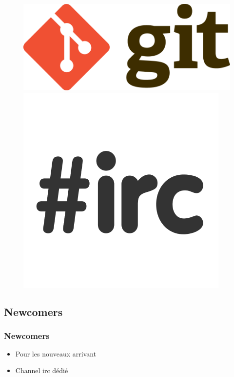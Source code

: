 \documentclass{beamer}
\begin{document}
\begin{frame}
\begin{figure}
    \includegraphics[scale=0.03]{images/git-logo.png} \hspace{1cm}
    \includegraphics[scale=0.07]{images/irc-logo.png}
  \end{figure}
  
\end{frame}

\subsection{Newcomers}
\begin{frame}
  \frametitle{Newcomers}
  \begin{itemize}
    \item Pour les nouveaux arrivant
    \item Channel irc dédié
  \end{itemize}
\end{frame}
\end{document}
